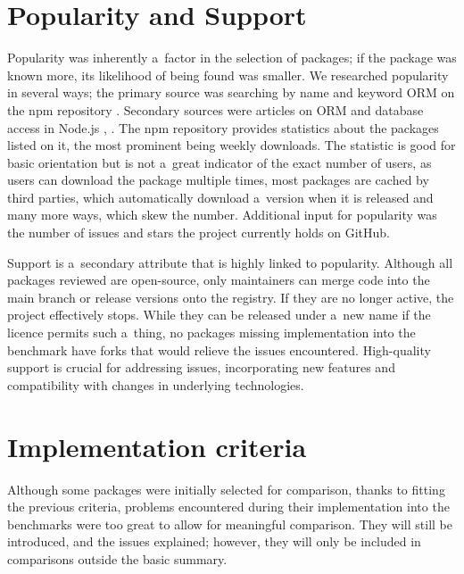 \section{Popularity and Support}
Popularity was inherently a~factor in the selection of packages; if the package
was known more, its likelihood of being found was smaller. We researched
popularity in several ways; the primary source was searching by name and keyword
ORM on the npm repository \cite{npmSearchORM}. Secondary sources were articles
on ORM and database access in Node.js \cite{SitePoint_2021}, \cite{Wang_2020}.
The npm repository provides statistics about the packages listed on it, the most
prominent being weekly downloads. The statistic is good for basic orientation
but is not a~great indicator of the exact number of users, as users can download
the package multiple times, most packages are cached by third parties, which
automatically download a~version when it is released and many more ways, which
skew the number. Additional input for popularity was the number of issues and
stars the project currently holds on GitHub.

Support is a~secondary attribute that is highly linked to popularity. Although
all packages reviewed are open-source, only maintainers can merge code into the
main branch or release versions onto the registry. If they are no longer active,
the project effectively stops. While they can be released under a~new name if
the licence permits such a~thing, no packages missing implementation into the
benchmark have forks that would relieve the issues encountered. High-quality
support is crucial for addressing issues, incorporating new features and
compatibility with changes in underlying technologies.

\section{Implementation criteria}
Although some packages were initially selected for comparison, thanks to fitting
the previous criteria, problems encountered during their implementation into the
benchmarks were too great to allow for meaningful comparison. They will still be
introduced, and the issues explained; however, they will only be included in
comparisons outside the basic summary.
